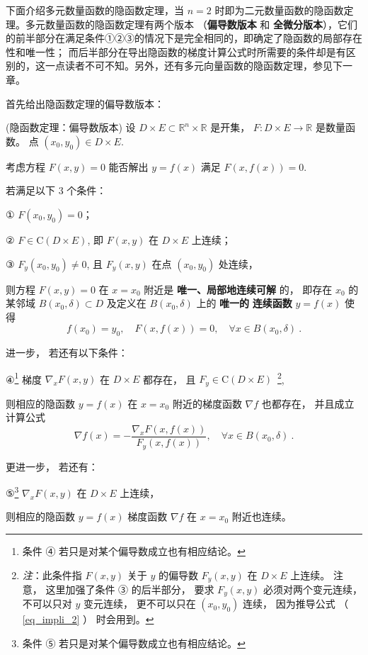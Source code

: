 下面介绍多元数量函数的隐函数定理，当 $n=2$ 时即为二元数量函数的隐函数定理。多元数量函数的隐函数定理有两个版本 （\textbf{偏导数版本} 和\textbf{ 全微分版本}），它们的前半部分在满足条件①②③的情况下是完全相同的，即确定了隐函数的局部存在性和唯一性； 而后半部分在导出隐函数的梯度计算公式时所需要的条件却是有区别的，这一点读者不可不知。另外，还有多元向量函数的隐函数定理，参见下一章。

首先给出隐函数定理的偏导数版本：

 \begin{theorem}{(隐函数定理：偏导数版本)}\label{the_impli_2}
 设 $D\times E\subset\mathbb{R}^{n}\times\mathbb{R}$ 是开集， $F:D\times E\rightarrow\mathbb{R}$
是数量函数。 点 $(x_{0},y_{0})\in D\times E.$ 

考虑方程 $F(x,y)=0$ 能否解出 $y=f(x)$ 满足 $F(x,f(x))=0.$ 

若满足以下 3 个条件：

① $F(x_{0},y_{0})=0$；

② $F\in\mathrm{C}(D\times E)$, 即 $F(x,y)$ 在 $D\times E$ 上连续； 

③ $F_{y}(x_{0},y_{0})\neq0$, 且 $F_{y}(x,y)$ 在点 $(x_0,y_0)$ 处连续，

则方程 $F(x,y)=0$ 在 $x=x_{0}$ 附近是\textbf{ 唯一、局部地连续可解} 的， 即存在 $x_{0}$
的某邻域 $B(x_{0},\delta)\subset D$ 及定义在 $B(x_{0},\delta)$ 上的 \textbf{唯一的} \textbf{
连续函数} $y=f(x)$ 使得
$$
f(x_{0})=y_{0},\quad F(x,f(x))=0,\quad\forall x\in B(x_{0},\delta)~.
$$

进一步， 若还有以下条件：

④\footnote{条件 ④ 若只是对某个偏导数成立也有相应结论。 } 梯度 $\nabla_{x}F(x,y)$ 在 $D\times E$
都存在， 且 $F_y\in\mathrm{C}(D\times E)$ $\,$\footnote{\textsl{注}：此条件指 $F(x,y)$ 关于 $y$ 的偏导数 $F_{y}(x,y)$
 在 $D\times E$ 上连续。 注意， 这里加强了条件 ③ 的后半部分， 要求 $F_{y}(x,y)$ 必须对两个变元连续， 不可以只对 $y$
 变元连续， 更不可以只在 $(x_0,y_0)$ 连续， 因为推导公式 （ \autoref{eq_impli_2} ） 时会用到。},

则相应的隐函数 $y=f(x)$ 在 $x=x_{0}$ 附近的梯度函数 $\nabla f$ 也都存在， 并且成立计算公式
\[
\nabla f(x)=-{\displaystyle \frac{\nabla_{x}F(x,f(x))}{F_{y}(x,f(x))}},\quad\forall x\in B(x_{0},\delta)~.
\]

更进一步， 若还有：

⑤\footnote{条件 ⑤ 若只是对某个偏导数成立也有相应结论。} $\nabla_{x}F(x,y)$ 在 $D\times E$
上连续， 

则相应的隐函数 $y=f(x)$ 梯度函数 $\nabla f$ 在 $x=x_{0}$ 附近也连续。


\end{theorem}

